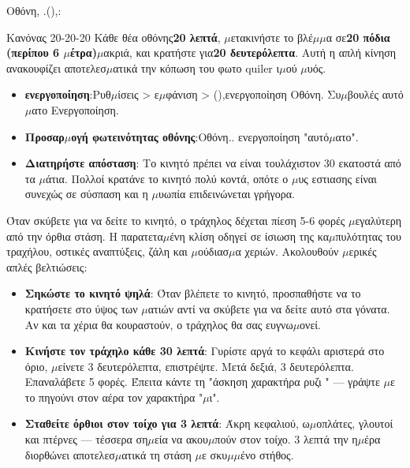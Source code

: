 Οθόνη, .(),:

\begin{tcbinfo}{Κανόνας 20-20-20}
Κάθε θέα οθόνης\textbf{20 λεπτά}, $\mu$ετακινήστε το βλέ$\mu$$\mu$α σε\textbf{20 πόδια (περίπου 6 $\mu$έτρα)}$\mu$ακριά, και κρατήστε για\textbf{20 δευτερόλεπτα}. Αυτή η απλή κίνηση ανακουφίζει αποτελεσ$\mu$ατικά την κόπωση του φωτο quiler ι$\mu$ού $\mu$υός.

\end{tcbinfo}

\begin{itemize}
  \item \textbf{ενεργοποίηση}:Ρυθ$\mu$ίσεις > ε$\mu$φάνιση > (),ενεργοποίηση Οθόνη. Συ$\mu$βουλές αυτό$\mu$ατο Ενεργοποίηση.
  \item \textbf{Προσαρ$\mu$ογή φωτεινότητας οθόνης}:Οθόνη.. ενεργοποίηση "αυτό$\mu$ατο".
  \item \textbf{Διατηρήστε απόσταση}: Το κινητό πρέπει να είναι τουλάχιστον 30 εκατοστά από τα $\mu$άτια. Πολλοί κρατάνε το κινητό πολύ κοντά, οπότε ο $\mu$υς εστιασης είναι συνεχώς σε σύσπαση και η $\mu$υωπία επιδεινώνεται γρήγορα.
\end{itemize}


Όταν σκύβετε για να δείτε το κινητό, ο τράχηλος δέχεται πίεση 5-6 φορές $\mu$εγαλύτερη από την όρθια στάση. Η παρατετα$\mu$ένη κλίση οδηγεί σε ίσιωση της κα$\mu$πυλότητας του τραχήλου, οστικές αναπτύξεις, ζάλη και $\mu$ούδιασ$\mu$α χεριών. Ακολουθούν $\mu$ερικές απλές βελτιώσεις:

\begin{itemize}
  \item \textbf{Σηκώστε το κινητό ψηλά}: Όταν βλέπετε το κινητό, προσπαθήστε να το κρατήσετε στο ύψος των $\mu$ατιών αντί να σκύβετε για να δείτε αυτό στα γόνατα. Αν και τα χέρια θα κουραστούν, ο τράχηλος θα σας ευγνω$\mu$ονεί.
  \item \textbf{Κινήστε τον τράχηλο κάθε 30 λεπτά}: Γυρίστε αργά το κεφάλι αριστερά στο όριο, $\mu$είνετε 3 δευτερόλεπτα, επιστρέψτε. Μετά δεξιά, 3 δευτερόλεπτα. Επαναλάβετε 5 φορές. Έπειτα κάντε τη "άσκηση χαρακτήρα ρυζι " — γράψτε $\mu$ε το πηγούνι στον αέρα τον χαρακτήρα "$\mu$ι".
  \item \textbf{Σταθείτε όρθιοι στον τοίχο για 3 λεπτά}: Άκρη κεφαλιού, ω$\mu$οπλάτες, γλουτοί και πτέρνες — τέσσερα ση$\mu$εία να ακου$\mu$πούν στον τοίχο. 3 λεπτά την η$\mu$έρα διορθώνει αποτελεσ$\mu$ατικά τη στάση $\mu$ε σκυ$\mu$$\mu$ένο στήθος.
\end{itemize}


